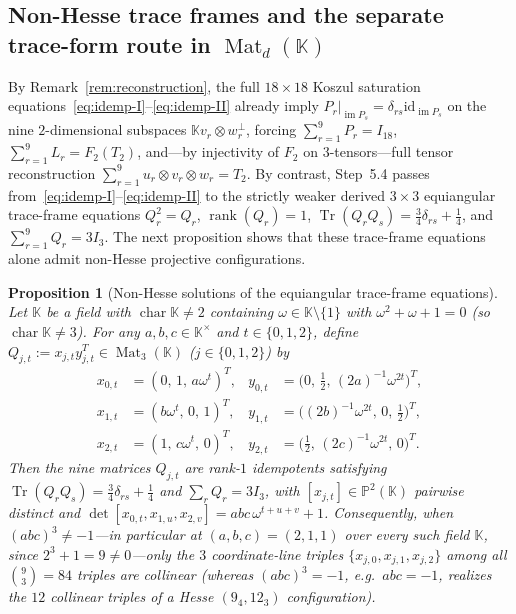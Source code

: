 \documentclass[11pt,reqno]{amsart}
\newtheorem{proposition}[theorem]{Proposition}
\theoremstyle{definition}
\theoremstyle{remark}
\numberwithin{equation}{section}
\newcommand{\KK}{\mathbb{K}}
\newcommand{\PP}{\mathbb{P}}
\DeclareMathOperator{\rk}{rank}
\DeclareMathOperator{\Mat}{Mat}
\DeclareMathOperator{\Tr}{Tr}
\DeclareMathOperator{\im}{im}
\DeclareMathOperator{\chr}{char}
\begin{document}
\subsection{Non-Hesse trace frames and the separate trace-form route in \texorpdfstring{$\Mat_d(\KK)$}{Mat(d, K)}}

By Remark~\ref{rem:reconstruction}, the full $18 \times 18$ Koszul saturation equations~\eqref{eq:idemp-I}--\eqref{eq:idemp-II} already imply $P_r|_{\im P_s} = \delta_{rs}\mathrm{id}_{\im P_s}$ on the nine $2$-dimensional subspaces $\KK v_r \otimes w_r^\perp$, forcing $\sum_{r=1}^9 P_r = I_{18}$, $\sum_{r=1}^9 L_r = F_2(T_2)$, and---by injectivity of $F_2$ on $3$-tensors---full tensor reconstruction $\sum_{r=1}^9 u_r \otimes v_r \otimes w_r = T_2$. By contrast, Step~5.4 passes from~\eqref{eq:idemp-I}--\eqref{eq:idemp-II} to the strictly weaker derived $3 \times 3$ equiangular trace-frame equations $Q_r^2 = Q_r$, $\rk(Q_r) = 1$, $\Tr(Q_r Q_s) = \frac{3}{4}\delta_{rs} + \frac{1}{4}$, and $\sum_{r=1}^9 Q_r = 3 I_3$. The next proposition shows that these trace-frame equations alone admit non-Hesse projective configurations.

\begin{proposition}[Non-Hesse solutions of the equiangular trace-frame equations]\label{prop:non-hesse}
Let $\KK$ be a field with $\chr\KK \neq 2$ containing $\omega \in \KK\setminus\{1\}$ with $\omega^2 + \omega + 1 = 0$ (so $\chr\KK \neq 3$). For any $a, b, c \in \KK^\times$ and $t \in \{0, 1, 2\}$, define $Q_{j,t} := x_{j,t} y_{j,t}^T \in \Mat_3(\KK)$ ($j \in \{0, 1, 2\}$) by
\begin{align*}
  x_{0,t} &= (0,\, 1,\, a\omega^t)^T, & y_{0,t} &= \bigl(0,\, \tfrac{1}{2},\, (2a)^{-1}\omega^{2t}\bigr)^T, \\
  x_{1,t} &= (b\omega^t,\, 0,\, 1)^T, & y_{1,t} &= \bigl((2b)^{-1}\omega^{2t},\, 0,\, \tfrac{1}{2}\bigr)^T, \\
  x_{2,t} &= (1,\, c\omega^t,\, 0)^T, & y_{2,t} &= \bigl(\tfrac{1}{2},\, (2c)^{-1}\omega^{2t},\, 0\bigr)^T.
\end{align*}
Then the nine matrices $Q_{j,t}$ are rank-$1$ idempotents satisfying $\Tr(Q_r Q_s) = \frac{3}{4}\delta_{rs} + \frac{1}{4}$ and $\sum_r Q_r = 3 I_3$, with $[x_{j,t}] \in \PP^2(\KK)$ pairwise distinct and $\det[x_{0,t}, x_{1,u}, x_{2,v}] = abc\,\omega^{t+u+v} + 1$. Consequently, when $(abc)^3 \neq -1$---in particular at $(a, b, c) = (2, 1, 1)$ over every such field $\KK$, since $2^3 + 1 = 9 \neq 0$---only the $3$ coordinate-line triples $\{x_{j,0}, x_{j,1}, x_{j,2}\}$ among all $\binom{9}{3} = 84$ triples are collinear (whereas $(abc)^3 = -1$, e.g.\ $abc = -1$, realizes the $12$ collinear triples of a Hesse $(9_4, 12_3)$ configuration).
\end{proposition}
\end{document}
